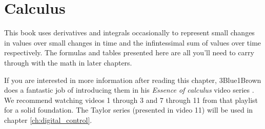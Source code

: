 
\chapter{Calculus}

This book uses derivatives and integrals occasionally to represent small changes
in values over small changes in time and the infintessimal sum of values over
time respectively. The formulas and tables presented here are all you'll need to
carry through with the math in later chapters.

If you are interested in more information after reading this chapter,
3Blue1Brown does a fantastic job of introducing them in his \textit{Essence of
calculus} video series \cite{bib:essence_of_calculus}. We recommend watching
videos 1 through 3 and 7 through 11 from that playlist for a solid foundation.
The Taylor series (presented in video 11) will be used in chapter
\ref{ch:digital_control}.

\renewcommand*{\chapterpath}{\partpath/calculus}




